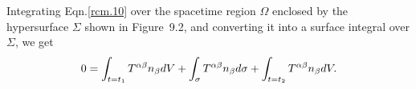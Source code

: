Integrating  Eqn.\eqref{rcm.10} over the spacetime region 
$\Omega$  enclosed by the hypersurface $\Sigma$ shown in 
Figure~9.2, and  converting it into a surface integral 
over $\Sigma$, we get
\begin{align} \label{rcm.22}
 0 = \int_{t=t_1}T^{{\alpha}{\beta}}n_{{\beta}} dV
+\int_{\sigma}T^{{\alpha}{\beta}}n_{{\beta}}
 d\sigma +\int_{t=t_2}T^{{\alpha}{\beta}}n_{{\beta}} dV.
\end{align}

\newpage

\begin{figure}[H]
\begin{center}
\end{center}
\end{figure}
